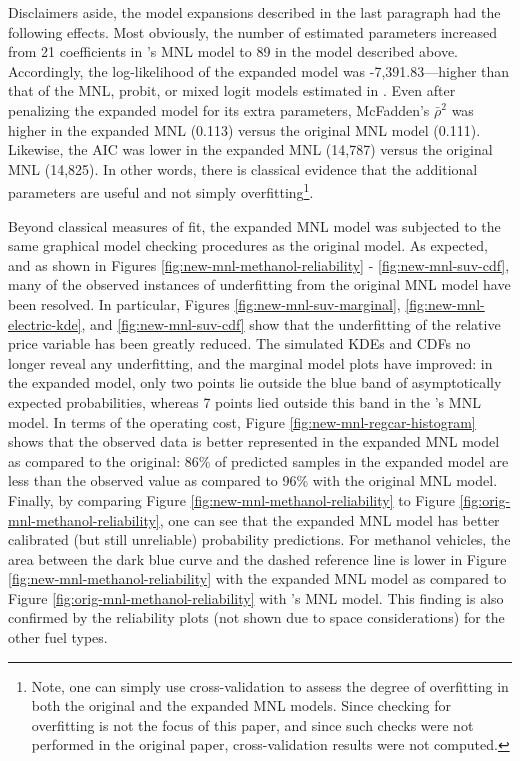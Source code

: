 \documentclass[preprint]{elsarticle}
\begin{document}
Disclaimers aside, the model expansions described in the last paragraph had the following effects. Most obviously, the number of estimated parameters increased from 21 coefficients in \citeauthor{brownstone_forecasting_1998}'s MNL model to 89 in the model described above. Accordingly, the log-likelihood of the expanded model was -7,391.83---higher than that of the MNL, probit, or mixed logit models estimated in \citet{brownstone_forecasting_1998}. Even after penalizing the expanded model for its extra parameters, McFadden's $\bar{\rho}^2$ was higher in the expanded MNL (0.113) versus the original MNL model (0.111). Likewise, the AIC was lower in the expanded MNL (14,787) versus the original MNL (14,825). In other words, there is classical evidence that the additional parameters are useful and not simply overfitting\footnote{Note, one can simply use cross-validation to assess the degree of overfitting in both the original and the expanded MNL models. Since checking for overfitting is not the focus of this paper, and since such checks were not performed in the original paper, cross-validation results were not computed.}.

Beyond classical measures of fit, the expanded MNL model was subjected to the same graphical model checking procedures as the original model. As expected, and as shown in Figures \ref{fig:new-mnl-methanol-reliability} - \ref{fig:new-mnl-suv-cdf}, many of the observed instances of underfitting from the original MNL model have been resolved. In particular, Figures \ref{fig:new-mnl-suv-marginal}, \ref{fig:new-mnl-electric-kde}, and \ref{fig:new-mnl-suv-cdf} show that the underfitting of the relative price variable has been greatly reduced. The simulated KDEs and CDFs no longer reveal any underfitting, and the marginal model plots have improved: in the expanded model, only two points lie outside the blue band of asymptotically expected probabilities, whereas 7 points lied outside this band in the \citeauthor{brownstone_forecasting_1998}'s MNL model. In terms of the operating cost, Figure \ref{fig:new-mnl-regcar-histogram} shows that the observed data is better represented in the expanded MNL model as compared to the original: 86\% of predicted samples in the expanded model are less than the observed value as compared to 96\% with the original MNL model. Finally, by comparing Figure \ref{fig:new-mnl-methanol-reliability} to Figure \ref{fig:orig-mnl-methanol-reliability}, one can see that the expanded MNL model has better calibrated (but still unreliable) probability predictions. For methanol vehicles, the area between the dark blue curve and the dashed reference line is lower in Figure \ref{fig:new-mnl-methanol-reliability} with the expanded MNL model as compared to Figure \ref{fig:orig-mnl-methanol-reliability} with \citeauthor{brownstone_forecasting_1998}'s MNL model. This finding is also confirmed by the reliability plots (not shown due to space considerations) for the other fuel types.
\end{document}
